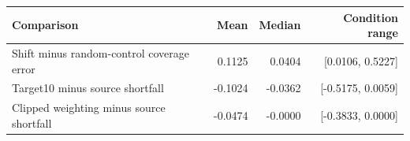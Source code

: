 \begin{tabular}{lrrr}
\toprule
Comparison & Mean & Median & Condition range \\
\midrule
Shift minus random-control coverage error & 0.1125 & 0.0404 & [0.0106, 0.5227] \\
Target10 minus source shortfall & -0.1024 & -0.0362 & [-0.5175, 0.0059] \\
Clipped weighting minus source shortfall & -0.0474 & -0.0000 & [-0.3833, 0.0000] \\
\bottomrule
\end{tabular}
